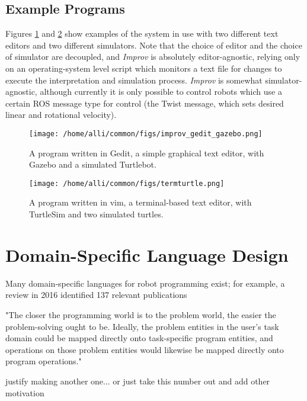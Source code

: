 \documentclass[sigconf]{acmart}
\begin{document}
\subsection{Example Programs}\label{example-programs}

Figures \ref{gedit} and \ref{vim} show examples of the system in use with two
different text editors and two different simulators. Note that the choice of
editor and the choice of simulator are decoupled, and \emph{Improv} is
absolutely editor-agnostic, relying only on an operating-system level script
which monitors a text file for changes to execute the interpretation and
simulation process. \emph{Improv} is somewhat simulator-agnostic, although
currently it is only possible to control robots which use a certain ROS message
type for control (the Twist message, which sets desired linear and rotational
velocity).

\begin{figure}[h]
\centering
\texttt{[image: /home/alli/common/figs/improv\_gedit\_gazebo.png]}
\caption{A program written in Gedit, a simple graphical text editor, with Gazebo and a simulated
Turtlebot.\label{gedit}}
\end{figure}

\begin{figure}[h]
\centering
\texttt{[image: /home/alli/common/figs/termturtle.png]}
\caption{A program written in vim, a terminal-based text editor, with TurtleSim and two
simulated turtles.\label{vim}}
\end{figure}



\section{Domain-Specific Language
Design}\label{domain-specific-language-design}

Many domain-specific languages for robot programming exist; for example, a
review in 2016 identified 137 relevant publications 

"The closer the programming world is to the problem world, the easier the
problem-solving ought to be. Ideally, the problem entities in the user's task
domain could be mapped directly onto task-specific program entities, and
operations on those problem entities would likewise be mapped directly onto
program operations."


{\color{red} justify making another one... or just take this number out and add
other motivation}
\end{document}
